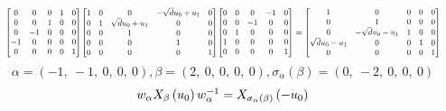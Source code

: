 \documentclass[11pt]{article}
\theoremstyle{definition}
\begin{document}
\[
\scaletoalign{\textwidth}{{\left[\begin{matrix}0 & 0 & 0 & 1 & 0\\0 & 0 & 1 & 0 & 0\\0 & -1 & 0 & 0 & 0\\-1 & 0 & 0 & 0 & 0\\0 & 0 & 0 & 0 & 1\end{matrix}\right]} {\left[\begin{matrix}1 & 0 & 0 & - \sqrt{d} u_{0} + u_{1} & 0\\0 & 1 & \sqrt{d} u_{0} + u_{1} & 0 & 0\\0 & 0 & 1 & 0 & 0\\0 & 0 & 0 & 1 & 0\\0 & 0 & 0 & 0 & 1\end{matrix}\right]} {\left[\begin{matrix}0 & 0 & 0 & -1 & 0\\0 & 0 & -1 & 0 & 0\\0 & 1 & 0 & 0 & 0\\1 & 0 & 0 & 0 & 0\\0 & 0 & 0 & 0 & 1\end{matrix}\right]} = {\left[\begin{matrix}1 & 0 & 0 & 0 & 0\\0 & 1 & 0 & 0 & 0\\0 & - \sqrt{d} u_{0} - u_{1} & 1 & 0 & 0\\\sqrt{d} u_{0} - u_{1} & 0 & 0 & 1 & 0\\0 & 0 & 0 & 0 & 1\end{matrix}\right]}}
\]
\[
\alpha = \left( -1, \  -1, \  0, \  0, \  0\right), \beta = \left( 2, \  0, \  0, \  0, \  0\right), \sigma_{\alpha}(\beta) = \left( 0, \  -2, \  0, \  0, \  0\right)
\]
\[
\scaletoalign{\textwidth}{w_{\alpha} X_{\beta}\left(u_{0}\right) w_{\alpha}^{-1} = X_{\sigma_{\alpha}\left(\beta\right)}\left(- u_{0}\right)}
\]
\end{document}
